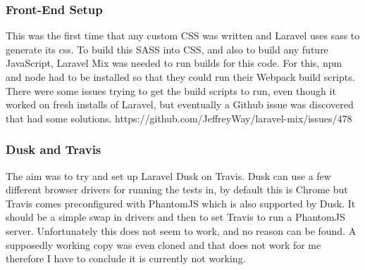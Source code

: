 \subsubsection{Front-End Setup}
This was the first time that any custom CSS was written and Laravel uses sass to generate its css. To build this SASS into CSS, and also to build any future JavaScript, Laravel Mix was needed to run builds for this code. For this, npm and node had to be installed so that they could run their Webpack build scripts. There were some issues trying to get the build scripts to run, even though it worked on fresh installs of Laravel, but eventually a Github issue was discovered that had some solutions.
https://github.com/JeffreyWay/laravel-mix/issues/478
\subsubsection{Dusk and Travis}
The aim was to try and set up Laravel Dusk on Travis. Dusk can use a few different browser drivers for running the tests in, by default this is Chrome but Travis comes preconfigured with PhantomJS which is also supported by Dusk. It should be a simple swap in drivers and then to set Travis to run a PhantomJS server. Unfortunately this does not seem to work, and no reason can be found. A supposedly working copy was even cloned and that does not work for me therefore I have to conclude it is currently not working.
\newpage
